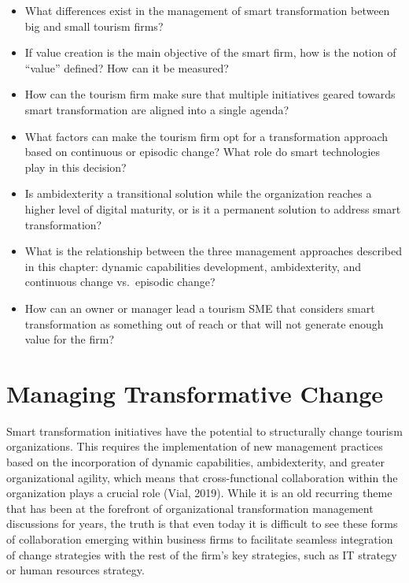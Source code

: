 \documentclass[
  letterpaper,
  DIV=11,
  numbers=noendperiod]{scrreprt}
\begin{document}
\begin{itemize}
\item
  What differences exist in the management of smart transformation
  between big and small tourism firms?
\item
  If value creation is the main objective of the smart firm, how is the
  notion of ``value'' defined? How can it be measured?
\item
  How can the tourism firm make sure that multiple initiatives geared
  towards smart transformation are aligned into a single agenda?
\item
  What factors can make the tourism firm opt for a transformation
  approach based on continuous or episodic change? What role do smart
  technologies play in this decision?
\item
  Is ambidexterity a transitional solution while the organization
  reaches a higher level of digital maturity, or is it a permanent
  solution to address smart transformation?
\item
  What is the relationship between the three management approaches
  described in this chapter: dynamic capabilities development,
  ambidexterity, and continuous change vs.~episodic change?
\item
  How can an owner or manager lead a tourism SME that considers smart
  transformation as something out of reach or that will not generate
  enough value for the firm?
\end{itemize}

\hypertarget{managing-transformative-change}{%
\chapter{Managing Transformative
Change}\label{managing-transformative-change}}

Smart transformation initiatives have the potential to structurally
change tourism organizations. This requires the implementation of new
management practices based on the incorporation of dynamic capabilities,
ambidexterity, and greater organizational agility, which means that
cross-functional collaboration within the organization plays a crucial
role (Vial, 2019). While it is an old recurring theme that has been at
the forefront of organizational transformation management discussions
for years, the truth is that even today it is difficult to see these
forms of collaboration emerging within business firms to facilitate
seamless integration of change strategies with the rest of the firm's
key strategies, such as IT strategy or human resources strategy.
\end{document}
